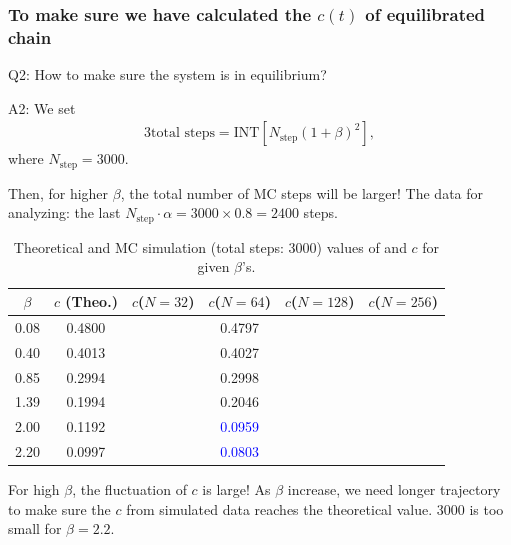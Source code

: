 \documentclass[8pt]{beamer}
\begin{document}
\begin{frame}
	\frametitle{To make sure we have calculated the $c(t)$ of equilibrated chain}
	Q2: How to make sure the system is in equilibrium?  
	
	A2: We set 
	\begin{alignat}{3}
	\text{total steps} = \text{INT}[N_\text{step} (1+\beta)^2], 
	\end{alignat}
where $N_\text{step}=3000$.

	 Then, for higher $\beta$, the total number of MC steps will be larger! The data for analyzing: the last $N_\text{step}\cdot \alpha = 3000\times 0.8 = 2400$ steps.
\begin{table}[htbp]
	\centering
			\caption{\label{tab:table_lino3} Theoretical and MC simulation (total steps: 3000) values of and $c$ for given $\beta$'s.}
	\begin{tabular}{cccccc}
		$\beta$ & $c$ (Theo.) & $c$($N=32$) & $c$($N=64$) & $c$($N=128$) &$c$($N=256$) \\
		\hline
		0.08 & 0.4800  & & 0.4797 &  &  \\
		0.40 & 0.4013 & & 0.4027 &  &  \\
		0.85 & 0.2994 & & 0.2998 &   &  \\
		1.39 & 0.1994 & & 0.2046 &  &  \\
		2.00 & 0.1192 & & \textcolor{blue}{0.0959} &  & \\
		2.20 & 0.0997 & & \textcolor{blue}{0.0803} & & 
	\end{tabular}
\end{table}
For high $\beta$, the fluctuation of $c$ is large! As $\beta$ increase, we need longer trajectory to make sure the $c$ from simulated data reaches the theoretical value. 3000 is too small for $\beta=2.2$.
\end{frame}
\end{document}
